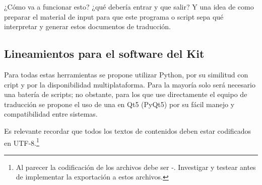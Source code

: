  ¿Cómo va a funcionar esto? ¿qué debería entrar y que salir? Y una idea de como preparar el material de input para que este programa o script sepa qué interpretar y generar estos documentos de traducción.

\subsection{Lineamientos para el software del Kit}\label{kit:lineamientos-software-kit}
Para todas estas herramientas se propone utilizar Python, por su similitud con cript y por la disponibilidad multiplataforma. Para la mayoría solo será necesario una batería de scripts; no obstante, para los que use directamente el equipo de traducción se propone el uso de una  en Qt5 (PyQt5) por su fácil manejo y compatibilidad entre sistemas.

Es relevante recordar que todos los textos de contenidos deben estar codificados en UTF-8.\footnote{Al parecer la codificación de los archivos  debe ser -. Investigar y testear antes de implementar la exportación a estos archivos.}